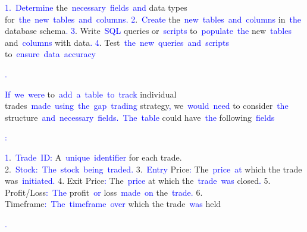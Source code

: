 \documentclass{article}
\begin{document}
\begin{tcolorbox}[colframe=black,colback=white]
{}\textcolor{blue}{1}\textcolor{blue}{.}\textcolor{blue}{~Determine} the\textcolor{blue}{~necessary}\textcolor{blue}{~fields}\textcolor{blue}{~and} data types for\textcolor{blue}{~the}\textcolor{blue}{~new}\textcolor{blue}{~tables}\textcolor{blue}{~and}\textcolor{blue}{~columns}\textcolor{blue}{.
}\textcolor{blue}{2}.\textcolor{blue}{~Create} the\textcolor{blue}{~new}\textcolor{blue}{~tables}\textcolor{blue}{~and}\textcolor{blue}{~columns} in\textcolor{blue}{~the} database schema\textcolor{blue}{.
}\textcolor{blue}{3}. Write\textcolor{blue}{~SQL} queries or\textcolor{blue}{~scripts} to\textcolor{blue}{~populate}\textcolor{blue}{~the} new\textcolor{blue}{~tables} and\textcolor{blue}{~columns} with data\textcolor{blue}{.
}\textcolor{blue}{4}. Test\textcolor{blue}{~the}\textcolor{blue}{~new}\textcolor{blue}{~queries}\textcolor{blue}{~and}\textcolor{blue}{~scripts} to\textcolor{blue}{~ensure}\textcolor{blue}{~data}\textcolor{blue}{~accuracy}\textcolor{blue}{.

}\textcolor{blue}{If}\textcolor{blue}{~we}\textcolor{blue}{~were} to\textcolor{blue}{~add}\textcolor{blue}{~a}\textcolor{blue}{~table}\textcolor{blue}{~to}\textcolor{blue}{~track} individual trades\textcolor{blue}{~made}\textcolor{blue}{~using}\textcolor{blue}{~the}\textcolor{blue}{~gap}\textcolor{blue}{~trading} strategy\textcolor{blue}{,} we\textcolor{blue}{~would}\textcolor{blue}{~need} to consider\textcolor{blue}{~the} structure\textcolor{blue}{~and}\textcolor{blue}{~necessary}\textcolor{blue}{~fields}\textcolor{blue}{.}\textcolor{blue}{~The}\textcolor{blue}{~table} could have\textcolor{blue}{~the} following\textcolor{blue}{~fields}\textcolor{blue}{:

}\textcolor{blue}{1}.\textcolor{blue}{~Trade}\textcolor{blue}{~ID}\textcolor{blue}{:} A\textcolor{blue}{~unique}\textcolor{blue}{~identifier} for each trade.
2.\textcolor{blue}{~Stock}\textcolor{blue}{:}\textcolor{blue}{~The}\textcolor{blue}{~stock}\textcolor{blue}{~being}\textcolor{blue}{~traded}\textcolor{blue}{.
}3.\textcolor{blue}{~Entry} Price\textcolor{blue}{:} The\textcolor{blue}{~price}\textcolor{blue}{~at} which the trade was\textcolor{blue}{~initiated}\textcolor{blue}{.
}4. Exit Price\textcolor{blue}{:} The\textcolor{blue}{~price} at which the\textcolor{blue}{~trade}\textcolor{blue}{~was} closed\textcolor{blue}{.
}5. Profit/Loss\textcolor{blue}{:}\textcolor{blue}{~The} profit\textcolor{blue}{~or} loss\textcolor{blue}{~made}\textcolor{blue}{~on} the\textcolor{blue}{~trade}\textcolor{blue}{.
}6. Timeframe\textcolor{blue}{:}\textcolor{blue}{~The}\textcolor{blue}{~timeframe}\textcolor{blue}{~over} which the trade\textcolor{blue}{~was} held\textcolor{blue}{.

}
\end{tcolorbox}
\end{document}

